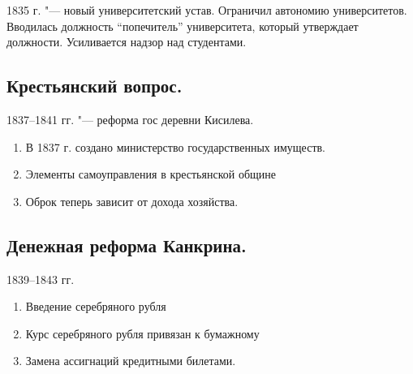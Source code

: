 1835 г. "--- новый университетский устав. Ограничил автономию университетов. Вводилась должность “попечитель” университета, который утверждает должности. Усиливается надзор над студентами.

\subsection{Крестьянский вопрос.}

1837--1841 гг. "--- реформа гос деревни Кисилева.

\begin{enumerate}
    \item{В 1837 г. создано министерство государственных имуществ.}
    \item{Элементы самоуправления в крестьянской общине}
    \item{Оброк теперь зависит от дохода хозяйства.}
\end{enumerate}

\subsection{Денежная реформа Канкрина.}

1839--1843 гг.

\begin{enumerate}
    \item{Введение серебряного рубля}
    \item{Курс серебряного рубля привязан к бумажному}
    \item{Замена ассигнаций кредитными билетами.}
\end{enumerate}
